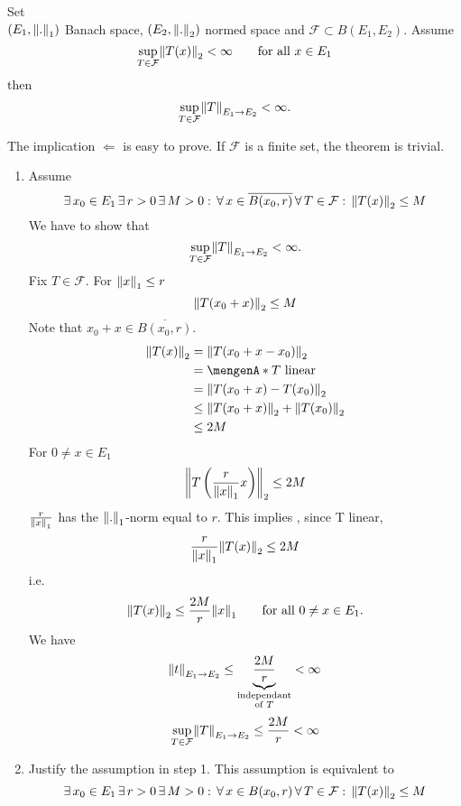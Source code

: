 \begin{theorem}
	Set \\ $(E_1,\norm{.}_1)$ Banach space, $(E_2,\norm{.}_2)$ normed space and $\mathcal{F} \subset B(E_1,E_2)$. Assume
	\[
		\sup\limits_{T \in \mathcal{F}}\norm{T(x)}_2 < \infty \qquad \text{for all } x \in E_1
	\]
	then
	\[
		\sup\limits_{T \in \mathcal{F}}\norm{T}_{E_1 \to E_2} < \infty.
	\]
	\end{theorem}
	\begin{bemerkung}
		The implication $\Leftarrow$ is easy to prove. If $\mathcal{F}$ is a finite set, the theorem is trivial.
	\end{bemerkung}
	\begin{beweis}
		\begin{enumerate}[Step 1:]
			\item Assume 
			\[
				\exists\,x_0 \in E_1\, \exists\, r >0 \,\exists\, M>0: \,\forall\, x \in \overline{B(x_0,r)} \, \forall\,  T \in \mathcal{F}: \,\norm{T(x)}_2 \leq M
			\]
			We have to show that 
			\[
				\sup\limits_{T \in \mathcal{F}} \norm{T}_{E_1 \to E_2} < \infty.
			\]
			Fix $T \in \mathcal{F}$. For $\norm{x}_1 \leq r$
			\[
				\norm{T(x_0+x)}_2 \leq M
			\]
			Note that $x_0+x \in \overline{B(x_0,r)}$.
			\begin{align*}
				\norm{T(x)}_2 &= \norm{T(x_0+x-x_0)}_2 \\ &= \set{T \text{ linear}} \\ &= \norm{T(x_0 + x)-T(x_0)}_2 \\ &\leq \norm{T(x_0+x)}_2 +
				\norm{T(x_0)}_2 \\ &\leq 2M
			\end{align*}
			For $0 \neq x \in E_1$ 
			\[
				\norm{T \left( \frac{r}{\norm{x}_1} x \right)}_2 \leq 2M
			\]
			$\frac{r}{\norm{x}_1} $ has the $\norm{.}_1$-norm equal to $r$. This implies , since T linear,
			\[
				\frac{r}{\norm{x}_1} \norm{T(x)}_2 \leq 2M
			\]
			i.e.
			\[
				\norm{T(x)}_2 \leq \frac{2M}{r}\norm{x}_1 \qquad \text{for all }0 \neq x \in E_1.
			\]
			We have
			\[
				\norm{t}_{E_1 \to E_2} \leq \underset{\substack{\text{independant}\\ \text{of }T}}{\underbrace{\frac{2M}{r}}} < \infty
			\]
			\[
				\sup\limits_{T \in \mathcal{F}}\norm{T}_{E_1 \to E_2} \leq \frac{2M}{r} < \infty
			\]
			\item Justify the assumption in step 1. This assumption is equivalent to
			\[
			\exists\,x_0 \in E_1\, \exists\, r >0 \,\exists\, M>0: \,\forall\, x \in B(x_0,r) \, \forall\,  T \in \mathcal{F}: \,\norm{T(x)}_2 \leq M	
\]
\end{enumerate}
\end{beweis}
